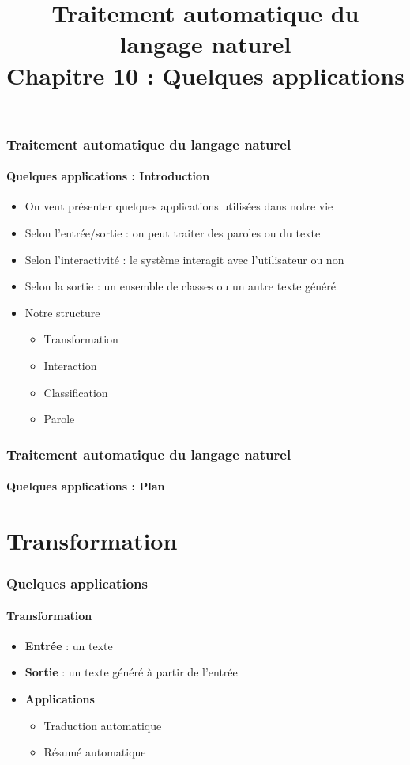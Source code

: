 \documentclass[xcolor=table]{beamer}
\title[TALN : 10- Quelques applications]%
{Traitement automatique du langage naturel\\Chapitre 10 : Quelques applications}
\begin{document}
	
\begin{frame}
\frametitle{Traitement automatique du langage naturel}
\framesubtitle{Quelques applications : Introduction}

	\begin{itemize}
		\item On veut présenter quelques applications utilisées dans notre vie
		\item Selon l'entrée/sortie : on peut traiter des paroles ou du texte
		\item Selon l'interactivité : le système interagit avec l'utilisateur ou non
		\item Selon la sortie : un ensemble de classes ou un autre texte généré
		\item Notre structure 
		\begin{itemize}
			\item Transformation
			\item Interaction
			\item Classification
			\item Parole
		\end{itemize}
	\end{itemize}

\end{frame}

%
%

\begin{frame}
\frametitle{Traitement automatique du langage naturel}
\framesubtitle{Quelques applications : Plan}

\begin{multicols}{2}
\tableofcontents
\end{multicols}
\end{frame}

\section{Transformation}

\begin{frame}
	\frametitle{Quelques applications}
	\framesubtitle{Transformation}
	\begin{itemize}
		\item \textbf{Entrée} : un texte 
		\item \textbf{Sortie} : un texte généré à partir de l'entrée
		\item \textbf{Applications} 
		\begin{itemize}
			\item Traduction automatique
			\item Résumé automatique
		\end{itemize}
	\end{itemize}
\end{frame}
\end{document}
